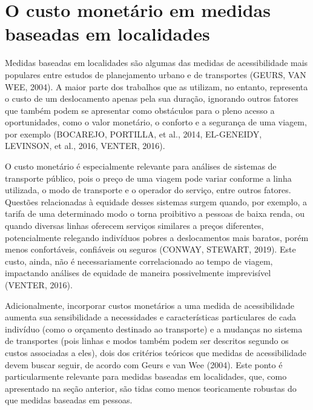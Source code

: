 \documentclass[msc,numbers]{coppe}
\begin{document}
  \hypertarget{o-custo-monetuxe1rio-em-medidas-baseadas-em-localidades}{%
  \section{O custo monetário em medidas baseadas em localidades}\label{o-custo-monetuxe1rio-em-medidas-baseadas-em-localidades}}

  Medidas baseadas em localidades são algumas das medidas de acessibilidade mais populares entre estudos de planejamento urbano e de transportes (GEURS, VAN WEE, 2004). A maior parte dos trabalhos que as utilizam, no entanto, representa o custo de um deslocamento apenas pela sua duração, ignorando outros fatores que também podem se apresentar como obstáculos para o pleno acesso a oportunidades, como o valor monetário, o conforto e a segurança de uma viagem, por exemplo (BOCAREJO, PORTILLA, et al., 2014, EL-GENEIDY, LEVINSON, et al., 2016, VENTER, 2016).

  O custo monetário é especialmente relevante para análises de sistemas de transporte público, pois o preço de uma viagem pode variar conforme a linha utilizada, o modo de transporte e o operador do serviço, entre outros fatores. Questões relacionadas à equidade desses sistemas surgem quando, por exemplo, a tarifa de uma determinado modo o torna proibitivo a pessoas de baixa renda, ou quando diversas linhas oferecem serviços similares a preços diferentes, potencialmente relegando indivíduos pobres a deslocamentos mais baratos, porém menos confortáveis, confiáveis ou seguros (CONWAY, STEWART, 2019). Este custo, ainda, não é necessariamente correlacionado ao tempo de viagem, impactando análises de equidade de maneira possivelmente imprevisível (VENTER, 2016).

  Adicionalmente, incorporar custos monetários a uma medida de acessibilidade aumenta sua sensibilidade a necessidades e características particulares de cada indivíduo (como o orçamento destinado ao transporte) e a mudanças no sistema de transportes (pois linhas e modos também podem ser descritos segundo os custos associadas a eles), dois dos critérios teóricos que medidas de acessibilidade devem buscar seguir, de acordo com Geurs e van Wee (2004). Este ponto é particularmente relevante para medidas baseadas em localidades, que, como apresentado na seção anterior, são tidas como menos teoricamente robustas do que medidas baseadas em pessoas.
\end{document}

